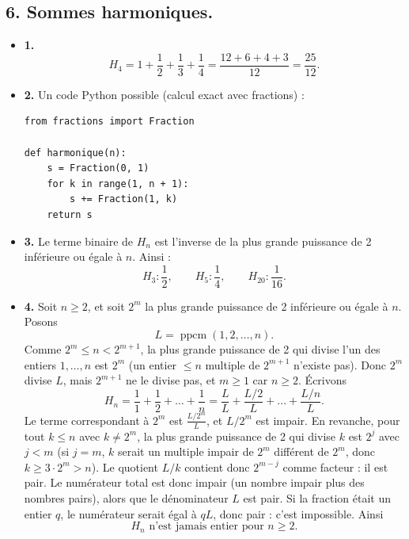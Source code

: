 
\subsection*{6. Sommes harmoniques.}
\begin{itemize}
    \item \textbf{1.} 
    \[H_4 = 1 + \frac{1}{2} + \frac{1}{3} + \frac{1}{4} = \frac{12 + 6 + 4 + 3}{12} = \frac{25}{12}.\]

    \item \textbf{2.} Un code Python possible (calcul exact avec fractions) :
    \begin{verbatim}
from fractions import Fraction

def harmonique(n):
    s = Fraction(0, 1)
    for k in range(1, n + 1):
        s += Fraction(1, k)
    return s
\end{verbatim}

    \item \textbf{3.} Le terme binaire de \(H_n\) est l'inverse de la plus grande puissance de 2 inférieure ou égale à \(n\). Ainsi :
    \[H_3 : \frac{1}{2},\qquad H_5 : \frac{1}{4},\qquad H_{20} : \frac{1}{16}.\]

    \item \textbf{4.} Soit \(n \geqslant 2\), et soit \(2^m\) la plus grande puissance de 2 inférieure ou égale à \(n\). Posons
    \[L = \operatorname{ppcm}(1, 2, \dots, n).\]
    Comme \(2^m \leqslant n < 2^{m+1}\), la plus grande puissance de 2 qui divise l'un des entiers \(1, \dots, n\) est \(2^m\) (un entier \(\leqslant n\) multiple de \(2^{m+1}\) n'existe pas). Donc \(2^m\) divise \(L\), mais \(2^{m+1}\) ne le divise pas, et \(m \geqslant 1\) car \(n \geqslant 2\). Écrivons
    \[H_n = \frac{1}{1} + \frac{1}{2} + \dots + \frac{1}{n} = \frac{L}{L} + \frac{L/2}{L} + \dots + \frac{L/n}{L}.\]
    Le terme correspondant à \(2^m\) est \(\frac{L/2^m}{L}\), et \(L/2^m\) est impair. En revanche, pour tout \(k \leqslant n\) avec \(k \neq 2^m\), la plus grande puissance de 2 qui divise \(k\) est \(2^j\) avec \(j < m\) (si \(j = m\), \(k\) serait un multiple impair de \(2^m\) différent de \(2^m\), donc \(k \geqslant 3 \cdot 2^m > n\)). Le quotient \(L/k\) contient donc \(2^{m-j}\) comme facteur : il est pair. Le numérateur total est donc impair (un nombre impair plus des nombres pairs), alors que le dénominateur \(L\) est pair. Si la fraction était un entier \(q\), le numérateur serait égal à \(qL\), donc pair : c'est impossible. Ainsi
    \[\boxed{H_n \text{ n'est jamais entier pour } n \geqslant 2.}\]
\end{itemize}

